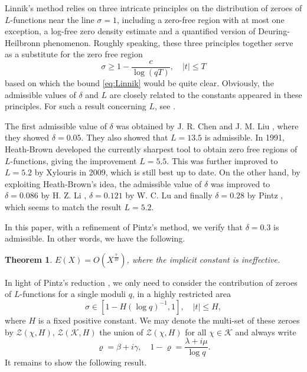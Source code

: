 \documentclass[10pt, reqno]{amsart}
\numberwithin{equation}{section}
\newtheorem{theorem}{Theorem}[section]
\renewcommand{\rho }{\operatorname{\varrho}}
\begin{document}
Linnik's method relies on three intricate principles on the distribution of zeroes of $L$-functions near the line $\sigma=1$, including a zero-free region with at most one exception, a log-free zero density estimate and a quantified version of Deuring-Heilbronn phenomenon. Roughly speaking, these three principles together serve as a substitute for the zero free region
\begin{equation}\label{eq:ZeroFreeRegion}
\sigma \geq 1-\frac{c}{\log (qT)},\quad |t|\leq T
\end{equation}
based on which the bound \eqref{eq:Linnik} would be quite clear. Obviously, the admissible values of $\delta$ and $L$ are closely related to the constants appeared in these principles. For such a result concerning $L$, see \cite[Corollary 18.8]{Iwaniec-Kowalski}.

The first admissible value of $\delta$ was obtained by J. R. Chen and J. M. Liu \cite{Chen-Liu}, where they showed $\delta=0.05$. They \cite{Chen-Liu-2} also showed that $L=13.5$ is admissible. In 1991, Heath-Brown \cite{Heath-Brown} developed the currently sharpest tool to obtain zero free regions of $L$-functions, giving the improvement $L=5.5$. This was further improved to $L=5.2$ by Xylouris \cite{Xylouris} in 2009, which is still best up to date. On the other hand, by exploiting Heath-Brown's idea, the admissible value of $\delta$ was improved to $\delta=0.086$ by H. Z. Li \cite{Li}, $\delta=0.121$ by W. C. Lu \cite{Lu} and finally $\delta=0.28$ by Pintz \cite{Pintz2018}, which seems to match the result $L=5.2$.

In this paper, with a refinement of Pintz's method, we verify that $\delta=0.3$ is admissible. In other words, we have the following.

\begin{theorem}\label{thm:main1}
$E(X)=O(X^{\frac{7}{10}})$, where the implicit constant is ineffective.
\end{theorem}

In light of Pintz's reduction \cite[Section 2]{Pintz2018}, we only need to consider the contribution of zeroes of $L$-functions for a single moduli $q$, in a highly restricted area
\begin{equation}\label{eq:RestrictedArea}
\sigma \in [1-H(\log q)^{-1},1],\quad |t|\leq H,
\end{equation}
where $H$ is a fixed positive constant. We may denote the multi-set of these zeroes by $\mathcal{Z}(\chi, H)$, $\mathcal{Z}(\mathcal{K}, H)$ the union of $\mathcal{Z}(\chi , H)$ for all $\chi \in \mathcal{K}$ and  always write
\begin{equation}\label{eq:rho}
\rho=\beta+i\gamma,\quad 1-\rho= \frac{\lambda +i\mu }{\log q}.
\end{equation}
It remains to show the following result.
\end{document}
